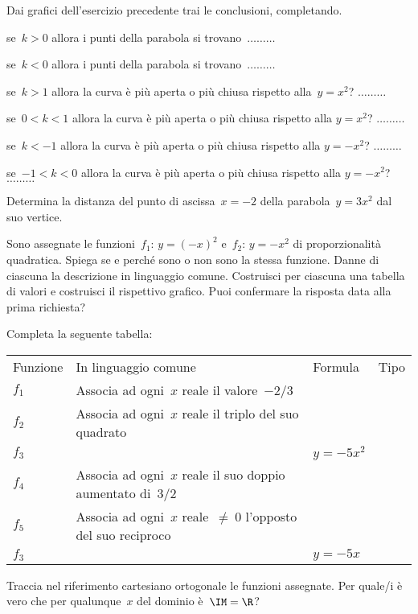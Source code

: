 \begin{esercizio}
\label{ese:D.54}
Dai grafici dell'esercizio precedente trai le conclusioni, completando.
\begin{enumeratea}
\item se~\(k>0\) allora i punti della parabola si trovano~\(\ldots \ldots 
\ldots\)
\item se~\(k<0\) allora i punti della parabola si trovano~\(\ldots \ldots 
\ldots\)
\item se~\(k>1\) allora la curva è più aperta o più chiusa rispetto 
alla~\(y=x^{2}\)? \(\ldots \ldots \ldots\)
\item se~\(0<k<1\) allora la curva è più aperta o più chiusa rispetto alla  
\(y=x^{2}\)? \(\ldots \ldots \ldots\)
\item se~\(k<-1\) allora la curva è più aperta o più chiusa rispetto alla  
\(y=-x^{2}\)? \(\ldots \ldots \ldots\)
\item se~\(-1<k<0\) allora la curva è più aperta o più chiusa rispetto alla  
\(y=-x^{2}\)? \(\ldots \ldots \ldots\)
\end{enumeratea}
\end{esercizio}

\begin{esercizio}
\label{ese:D.55}
Determina la distanza del punto di ascissa~\(x=-2\) della 
parabola~\(y=3x^{2}\) dal 
suo vertice.
\end{esercizio}

\begin{esercizio}
\label{ese:D.56}
Sono assegnate le funzioni~\(f_{1}:\, y=(-x)^{2}\) e~\(f_{2}:\, y=-x^{2}\) di 
proporzionalità quadratica.
Spiega se e perché sono o non sono la stessa funzione.
Danne di ciascuna la descrizione in linguaggio comune.
Costruisci per ciascuna una tabella di valori e costruisci il rispettivo 
grafico.
Puoi confermare la risposta data alla prima richiesta?
\end{esercizio}

\begin{esercizio}
\label{ese:D.57}
Completa la seguente tabella:
\begin{center}
 \begin{tabular}{llll}
  \toprule
  Funzione&In linguaggio comune&Formula&Tipo\\
  \(f_1\)&Associa ad ogni~\(x\) reale il valore~\(-2/3\)& &\\
  \(f_2\)&Associa ad ogni~\(x\) reale il triplo del suo quadrato& & \\
  \(f_3\)& &\(y=-5x^2\)& \\
  \(f_4\)&Associa ad ogni~\(x\) reale il suo doppio aumentato di~\(3/2\)& & \\
  \(f_5\)&Associa ad ogni~\(x\) reale~\(\neq~0\) l'opposto del suo reciproco& 
& \\
  \(f_3\)& &\(y=-5x\)& \\
  \bottomrule
 \end{tabular}
\end{center}
Traccia nel riferimento cartesiano ortogonale le funzioni assegnate. Per 
quale/i 
è vero che per qualunque~\(x\) del dominio è~\(\IM=\R\)?
\end{esercizio}

